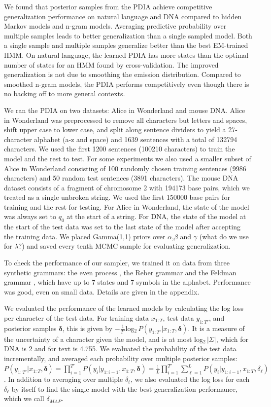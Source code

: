 We found that posterior samples from the PDIA achieve competitive generalization performance on natural language and DNA compared to hidden Markov models and n-gram models.  Averaging predictive probability over multiple samples leads to better generalization than a single sampled model.  Both a single sample and multiple samples generalize better than the best EM-trained HMM.  On natural language, the learned PDIA has more states than the optimal number of states for an HMM found by cross-validation.  The improved generalization is not due to smoothing the emission distribution.  Compared to smoothed n-gram models, the PDIA performs competitively even though there is no backing off to more general contexts.

We ran the PDIA on two datasets: Alice in Wonderland and mouse DNA.  Alice in Wonderland was preprocessed to remove all characters but letters and spaces, shift upper case to lower case, and split along sentence dividers to yield a 27-character alphabet (a-z and space) and 1639 sentences with a total of 132794 characters.  We used the first 1200 sentences (100210 characters) to train the model and the rest to test.  For some experiments we also used a smaller subset of Alice in Wonderland consisting of 100 randomly chosen training sentences (9986 characters) and 50 random test sentences (3891 characters).  The mouse DNA dataset consists of a fragment of chromosome 2 with 194173 base pairs, which we treated as a single unbroken string.  We used the first 150000 base pairs for training and the rest for testing.  For Alice in Wonderland, the state of the model was always set to $q_0$ at the start of a string.  For DNA, the state of the model at the start of the test data was set to the last state of the model after accepting the training data.  We placed Gamma(1,1) priors over $\alpha$,$\beta$ and $\gamma$ (what do we use for $\lambda$?) and saved every tenth MCMC sample for evaluating generalization.

To check the performance of our sampler, we trained it on data from three synthetic grammars: the even process \cite{?}, the Reber grammar \cite{Reber} and the Feldman grammar \cite{Feldman}, which have up to 7 states and 7 symbols in the alphabet.  Performance was good, even on small data.  Details are given in the appendix.

We evaluated the performance of the learned models by calculating the log loss per character of the test data.  For training data $x_{1:T}$, test data $y_{1:T'}$, and posterior samples $\boldsymbol\delta$, this is given by $-\frac{1}{T'}$log$_2\, P(y_{1:T'}|x_{1:T},\boldsymbol\delta)$.  It is a measure of the uncertainty of a character given the model, and is at most log$_2\,|\Sigma|$, which for DNA is 2 and for text is 4.755.  We evaluated the probability of the test data incrementally, and averaged each probability over multiple posterior samples: $P(y_{1:T'}|x_{1:T},\boldsymbol\delta) = \prod_{i = 1}^{T'} P(y_i|y_{1:i-1},x_{1:T},\boldsymbol\delta) = \frac{1}{L}\prod_{i = 1}^{T'} \sum_{\ell = 1}^{L} P(y_i|y_{1:i-1},x_{1:T},\delta_\ell)$.  In addition to averaging over multiple $\delta_\ell$, we also evaluated the log loss for each $\delta_\ell$ by itself to find the single model with the best generalization performance, which we call $\delta_{MAP}$.

